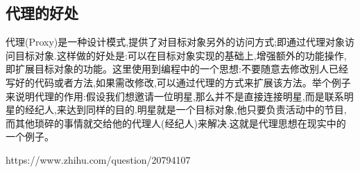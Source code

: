 \documentclass[../../../interview-questions.tex]{subfiles}
\begin{document}
\subsection{代理的好处}

代理(Proxy)是一种设计模式,提供了对目标对象另外的访问方式;即通过代理对象访问目标对象.这样做的好处是:可以在目标对象实现的基础上,增强额外的功能操作,即扩展目标对象的功能。这里使用到编程中的一个思想:不要随意去修改别人已经写好的代码或者方法,如果需改修改,可以通过代理的方式来扩展该方法。举个例子来说明代理的作用:假设我们想邀请一位明星,那么并不是直接连接明星,而是联系明星的经纪人,来达到同样的目的.明星就是一个目标对象,他只要负责活动中的节目,而其他琐碎的事情就交给他的代理人(经纪人)来解决.这就是代理思想在现实中的一个例子。

https://www.zhihu.com/question/20794107
\end{document}
